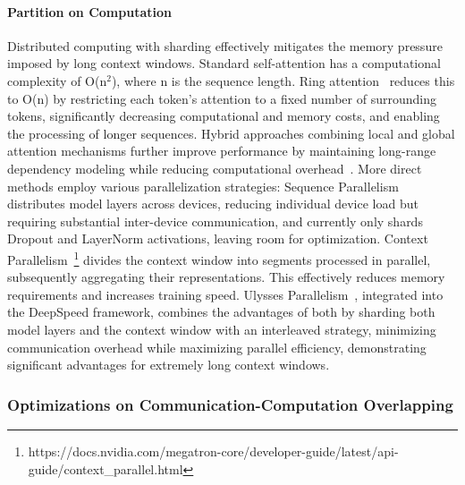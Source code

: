 \documentclass[11pt, a4paper, logo, copyright, nonumbering]{map}
\begin{document}
\paragraph{Partition on Computation}
Distributed computing with sharding effectively mitigates the memory pressure imposed by long context windows.
Standard self-attention has a computational complexity of O(n$^2$), where n is the sequence length.
Ring attention~\cite{liu2023ring} reduces this to O(n) by restricting each token's attention to a fixed number of surrounding tokens, significantly decreasing computational and memory costs, and enabling the processing of longer sequences.
Hybrid approaches combining local and global attention mechanisms further improve performance by maintaining long-range dependency modeling while reducing computational overhead~\cite{liu2024world,brandon2023striped}.
More direct methods employ various parallelization strategies: 
Sequence Parallelism~\cite{korthikanti2023reducing} distributes model layers across devices, reducing individual device load but requiring substantial inter-device communication, and currently only shards Dropout and LayerNorm activations, leaving room for optimization.
Context Parallelism~\footnote{https://docs.nvidia.com/megatron-core/developer-guide/latest/api-guide/context\_parallel.html} divides the context window into segments processed in parallel, subsequently aggregating their representations. 
This effectively reduces memory requirements and increases training speed. 
Ulysses Parallelism~\cite{jacobs2023deepspeed}, integrated into the DeepSpeed framework, combines the advantages of both by sharding both model layers and the context window with an interleaved strategy, minimizing communication overhead while maximizing parallel efficiency, demonstrating significant advantages for extremely long context windows.

\subsubsection{Optimizations on Communication-Computation Overlapping}
\end{document}
